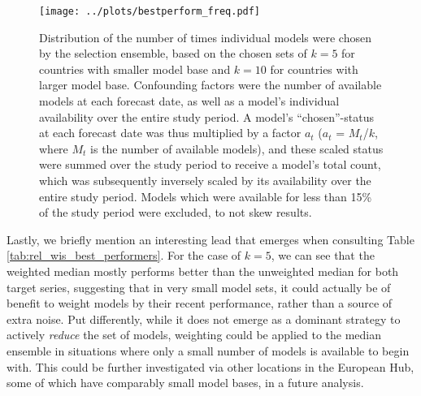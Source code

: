 \begin{figure}
\centering
\texttt{[image: ../plots/bestperform\_freq.pdf]}
\caption{Distribution of the number of times individual models were chosen by the selection ensemble, based on the chosen sets of $k = 5$ for countries with smaller model base and $k = 10$ for countries with larger model base. Confounding factors were the number of available models at each forecast date, as well as a model's individual availability over the entire study period. A model's ``chosen''-status at each forecast date was thus multiplied by a factor $a_t$ ($a_t$ = $M_t$/$k$, where $M_t$ is the number of available models), and these scaled status were summed over the study period to receive a model's total count, which was subsequently inversely scaled by its availability over the entire study period. Models which were available for less than 15\% of the study period were excluded, to not skew results.}
\label{fig:bestperform_freq}
\end{figure}
Lastly, we briefly mention an interesting lead that emerges when consulting Table \ref{tab:rel_wis_best_performers}. For the case of $k = 5$, we can see that the weighted median mostly performs better than the unweighted median for both target series, suggesting that in very small model sets, it could actually be of benefit to weight models by their recent performance, rather than a source of extra noise. Put differently, while it does not emerge as a dominant strategy to actively \textit{reduce} the set of models, weighting could be applied to the median ensemble in situations where only a small number of models is available to begin with. This could be further investigated via other locations in the European Hub, some of which have comparably small model bases, in a future analysis. \medskip\\
